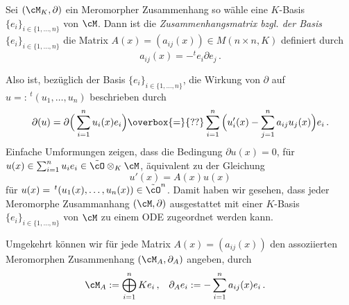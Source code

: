 \begin{defn}[Zusammenhangsmatrix] \cite[Seite 129]{hotta2007d}
Sei $(\cM_K,\partial)$ ein Meromorpher Zusammenhang so wähle eine $K$-Basis
$\{e_i\}_{i\in\{1,\dots,n\}}$ von $\cM$. Dann ist die
\emph{Zusammenhangsmatrix bzgl. der Basis $\{e_i\}_{i\in\{1,\dots,n\}}$} die
Matrix $A(x)=(a_{ij}(x))\in M(n\times n,K)$ definiert durch
\[ a_{ij}(x) = -^te_i \partial e_j \,. \]
\end{defn}

Also ist, bezüglich der Basis $\{e_i\}_{i\in\{1,\dots,n\}}$, die Wirkung von
$\partial$ auf $u=:\,^t(u_1,\dots,u_n)$ beschrieben durch
\[
\partial(u) = \partial \Big( \sum_{i=1}^nu_i(x)e_i \Big)
\overbox{=}{??}\sum_{i=1}^n \Big( u_i'(x)-
\sum_{j=1}^na_{ij}u_j(x) \Big)e_i \,.
\]
Einfache Umformungen zeigen, dass die Bedingung $\partial u(x)=0$, für
$u(x)\in \sum_{i=1}^n u_ie_i\in \tilde \cO \otimes_K\cM$, äquivalent zu der
Gleichung
\begin{equation*}
u'(x)=A(x)u(x)
\end{equation*}
für $u(x)=\,^t(u_1(x),\dots,u_n(x))\in\tilde \cO^n$. Damit haben wir gesehen,
dass jeder Meromorphe Zusammanhang $(\cM,\partial)$ ausgestattet mit einer
$K$-Basis $\{e_i\}_{i\in\{1,\dots,n\}}$ von $\cM$ zu einem ODE zugeordnet
werden kann. 

Umgekehrt können wir für jede Matrix $A(x)=(a_{ij}(x))$ den
assoziierten Meromorphen Zusammenhang $(\cM_A,\partial_A)$ %
angeben, durch
\begin{align*}
\cM_A & :=\bigoplus_{i=1}^n Ke_i \,, & \partial_A e_i &:=
-\sum_{i=1}^na_{ij}(x)e_i \,.
\end{align*}

\begin{comment}
\section{Alternativer Zugang}
Hier wird nun ein alternativer Zugang, wie in \cite[3.1.1]{sabbah_cimpa90}, 
präsentiert. Sei $\cF$ ein Funktionenraum, auf dem die Differentialoperatoren
$\cD$ wirken.

Sei $P$ ein linearer Differentialoperator mit Koeffizienten in $a_i(t)\in\Ckx$
geschrieben als $P=\sum^{d}_{i=0}{a_{i}(t)\partial_t^i}$.
Man sagt eine Funktion $u\in\cF$ ist Lösung von $P$, falls $u$ die Gleichung
$Pu=0$ erfüllt.
Man sagt $0$ ist ein singulärer Punkt falls $a_d(0)=0$.
Falls $0$ kein singulärer Punkt ist, hat $P$ genau $d$ über $\C$ Unabhängige
Lösungen in $\C\{t\}$. %

Falls $u$ ein Lösung von $P$ ist, so ist $u$ auch Lösung von $Q\cdot P$ mit
$Q\in \cD$. Also hängt die Lösung nur vom Links Ideal $I$ von $\cD$, welches
von $P$ erzeugt wird.
\end{comment}

